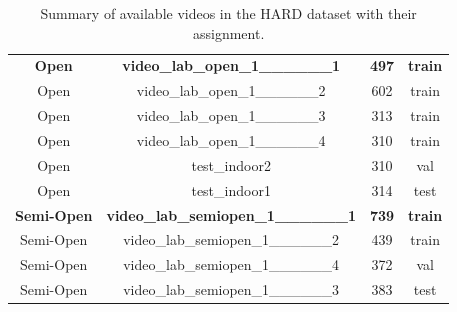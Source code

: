 \documentclass[12pt,oneside]{book} %
\begin{document}
\begin{table}[H]
\begin{tabular}{@{}cccc@{}}
        \textbf{Open}      & \textbf{video\_lab\_open\_1\_\_\_\_\_\_1}     & \textbf{497}              & \textbf{train}      \\
        Open               & video\_lab\_open\_1\_\_\_\_\_\_2              & 602                       & train               \\
        Open               & video\_lab\_open\_1\_\_\_\_\_\_3              & 313                       & train               \\
        Open               & video\_lab\_open\_1\_\_\_\_\_\_4              & 310                       & train               \\
        Open               & test\_indoor2                                 & 310                       & val                 \\
        Open               & test\_indoor1                                 & 314                       & test                \\
        \textbf{Semi-Open} & \textbf{video\_lab\_semiopen\_1\_\_\_\_\_\_1} & \textbf{739}              & \textbf{train}      \\
        Semi-Open          & video\_lab\_semiopen\_1\_\_\_\_\_\_2          & 439                       & train               \\
        Semi-Open          & video\_lab\_semiopen\_1\_\_\_\_\_\_4          & 372                       & val                 \\ 
        Semi-Open          & video\_lab\_semiopen\_1\_\_\_\_\_\_3          & 383                       & test                \\ \bottomrule
    \end{tabular}
    \caption{\centering Summary of available videos in the HARD dataset with their assignment.}
    \label{tab:video_summary}
\end{table}
\end{document}

